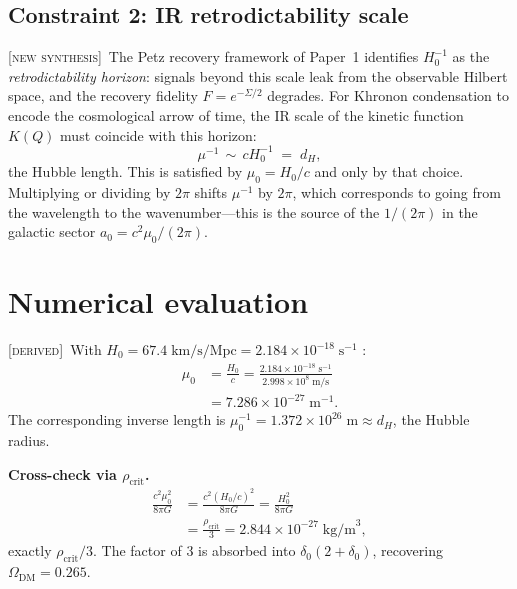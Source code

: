 \documentclass[prd,twocolumn,superscriptaddress,longbibliography,floatfix]{revtex4-2}
\newcommand{\Hzero}{H_{0}}
\newcommand{\muzero}{\mu_{0}}
\newcommand{\rhocrit}{\rho_{\mathrm{crit}}}
\newcommand{\OmegaDM}{\Omega_{\mathrm{DM}}}
\newcommand{\derived}{\textsc{[derived]}}
\newcommand{\new}{\textsc{[new synthesis]}}
\begin{document}
\subsection{Constraint 2: IR retrodictability scale}

\new\ The Petz recovery framework of Paper~1
\cite{Huang2025paper1} identifies $\Hzero^{-1}$ as the
\emph{retrodictability horizon}: signals beyond this
scale leak from the observable Hilbert space, and the
recovery fidelity $F = e^{-\Sigma/2}$ degrades.
For Khronon condensation to encode the cosmological arrow
of time, the IR scale of the kinetic function $K(Q)$
must coincide with this horizon:
\begin{equation}
\mu^{-1} \,\sim\, c\Hzero^{-1} \;=\; d_{H},
\label{eq:horizon}
\end{equation}
the Hubble length.  This is satisfied by
$\muzero = \Hzero/c$ and only by that choice.
Multiplying or dividing by $2\pi$ shifts $\mu^{-1}$ by
$2\pi$, which corresponds to going from the wavelength
to the wavenumber---this is the source of the $1/(2\pi)$
in the galactic sector $a_{0} = c^{2}\muzero/(2\pi)$.

\section{Numerical evaluation}
\label{sec:numerical}

\derived\ With $\Hzero = 67.4\;\mathrm{km/s/Mpc}
= 2.184 \times 10^{-18}\;\mathrm{s}^{-1}$
\cite{Planck2018}:
\begin{align}
\muzero
&= \frac{\Hzero}{c}
= \frac{2.184 \times 10^{-18}\;\mathrm{s}^{-1}}
       {2.998 \times 10^{8}\;\mathrm{m/s}}\nonumber\\
&= 7.286 \times 10^{-27}\;\mathrm{m}^{-1}.
\label{eq:mu0_num}
\end{align}
The corresponding inverse length is
$\muzero^{-1} = 1.372 \times 10^{26}\;\mathrm{m}
\approx d_{H}$, the Hubble radius.

\textbf{Cross-check via $\rhocrit$.}
\begin{align}
\frac{c^{2}\muzero^{2}}{8\pi G}
&= \frac{c^{2}(\Hzero/c)^{2}}{8\pi G}
= \frac{\Hzero^{2}}{8\pi G}\nonumber\\
&= \frac{\rhocrit}{3}
= 2.844 \times 10^{-27}\;\mathrm{kg/m}^{3},
\label{eq:rho_check}
\end{align}
exactly $\rhocrit/3$.  The factor of $3$ is absorbed
into $\delta_{0}(2+\delta_{0})$, recovering
$\OmegaDM = 0.265$.
\end{document}
